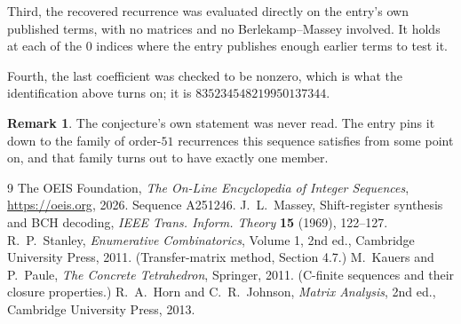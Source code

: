 \documentclass[11pt,a4paper]{article}
\theoremstyle{plain}
\theoremstyle{definition}
\newtheorem{remark}[theorem]{Remark}
\begin{document}
Third, the recovered recurrence was evaluated directly on the entry's own published terms, with
no matrices and no Berlekamp--Massey involved. It holds at each of the $0$ indices where
the entry publishes enough earlier terms to test it.

Fourth, the last coefficient was checked to be nonzero, which is what the identification above
turns on; it is $835234548219950137344$.

\begin{remark}
The conjecture's own statement was never read. The entry pins it down to the family of
order-$51$ recurrences this sequence satisfies from some point on, and that family turns
out to have exactly one member.
\end{remark}

\begin{thebibliography}{9}
 The OEIS Foundation, \emph{The On-Line Encyclopedia of Integer
Sequences}, \url{https://oeis.org}, 2026. Sequence A251246.
 J.~L.~Massey, Shift-register synthesis and BCH decoding, \emph{IEEE
Trans. Inform. Theory} \textbf{15} (1969), 122--127.
 R.~P.~Stanley, \emph{Enumerative Combinatorics}, Volume 1, 2nd ed.,
Cambridge University Press, 2011. (Transfer-matrix method, Section 4.7.)
 M.~Kauers and P.~Paule, \emph{The Concrete Tetrahedron}, Springer, 2011.
(C-finite sequences and their closure properties.)
 R.~A.~Horn and C.~R.~Johnson, \emph{Matrix Analysis}, 2nd ed., Cambridge
University Press, 2013.
\end{thebibliography}
\end{document}
